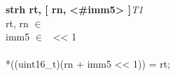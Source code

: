 


\begin{instructionblock}{\imagewidth}%
    \textbf{strh rt, [ rn, <\#imm5> ]}\hfill\textit{T1}\\
    rt, rn $\in$ \baseregisters\\
    imm5 $\in$ \immFive\ {<}{<} 1\\
    \\
    {*}((uint16\_t)(rn + imm5 {<}{<} 1)) = rt;
\end{instructionblock}

